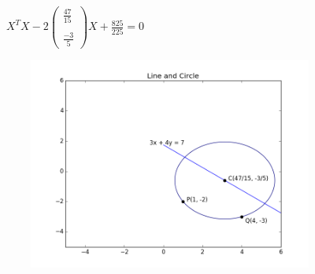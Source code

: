 \documentclass[journal,12pt,twocolumn]{IEEEtran}
\newcommand{\myvec}[1]{\ensuremath{\begin{pmatrix}#1\end{pmatrix}}}
\begin{document}
$X^TX - 2\myvec{ \frac{47}{15} \\ \\ \frac{-3}{5} }X + \frac{825}{225} = 0$

\includegraphics[width=11cm, height=7cm]{circle}
\end{document}
